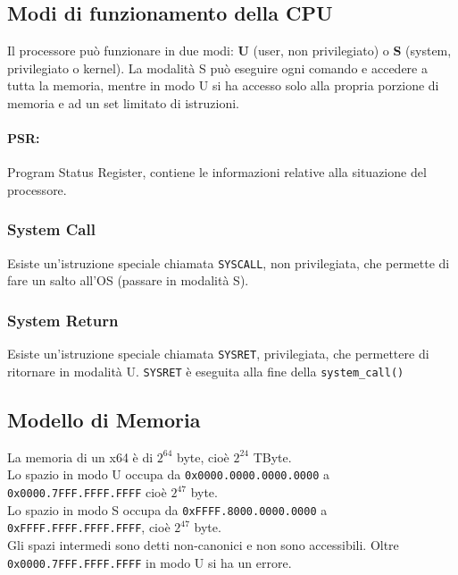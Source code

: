 \documentclass[10pt,a4paper]{article}
\newcommand{\code}{\texttt}
\begin{document}
    \subsection{Modi di funzionamento della CPU}
    Il processore può funzionare in due modi: \textbf{U} (user, non privilegiato) o \textbf{S} (system, privilegiato o kernel).
    La modalità S può eseguire ogni comando e accedere a tutta la memoria, mentre in modo U si ha accesso solo alla propria porzione di memoria e ad un set limitato di istruzioni.
    \paragraph{PSR:} Program Status Register, contiene le informazioni relative alla situazione del processore.
    \subsubsection{System Call}
    Esiste un'istruzione speciale chiamata \code{SYSCALL}, non privilegiata, che permette di fare un salto all'OS (passare in modalità S).
    \subsubsection{System Return}
    Esiste un'istruzione speciale chiamata \code{SYSRET}, privilegiata, che permettere di ritornare in modalità U.
    \code{SYSRET} è eseguita alla fine della \code{system\_call()}
    \subsection{Modello di Memoria}
    La memoria di un x64 è di $2^{64}$ byte, cioè $2^{24}$ TByte.\\
    Lo spazio in modo U occupa da \code{0x0000.0000.0000.0000} a \code{0x0000.7FFF.FFFF.FFFF} cioè $2^{47}$ byte.\\
    Lo spazio in modo S occupa da \code{0xFFFF.8000.0000.0000} a \code{0xFFFF.FFFF.FFFF.FFFF}, cioè $2^{47}$ byte.\\
    Gli spazi intermedi sono detti non-canonici e non sono accessibili. Oltre \code{0x0000.7FFF.FFFF.FFFF} in modo U si ha un errore.
\end{document}
